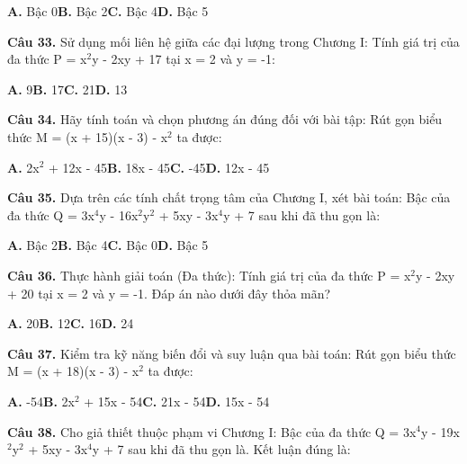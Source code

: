 \documentclass[11pt,a4paper]{article}
\begin{document}
\hspace*{1.5em}\textbf{A.} Bậc 0\quad\quad \textbf{B.} Bậc 2\quad\quad \textbf{C.} Bậc 4\quad\quad \textbf{D.} Bậc 5\par\vspace{2pt}
\textbf{\color{primary} Câu 33.} Sử dụng mối liên hệ giữa các đại lượng trong Chương I: Tính giá trị của đa thức P = x$^2$y - 2xy + 17 tại x = 2 và y = -1:\par
\hspace*{1.5em}\textbf{A.} 9\quad\quad \textbf{B.} 17\quad\quad \textbf{C.} 21\quad\quad \textbf{D.} 13\par\vspace{2pt}
\textbf{\color{primary} Câu 34.} Hãy tính toán và chọn phương án đúng đối với bài tập: Rút gọn biểu thức M = (x + 15)(x - 3) - x$^2$ ta được:\par
\hspace*{1.5em}\textbf{A.} 2x$^2$ + 12x - 45\quad\quad \textbf{B.} 18x - 45\quad\quad \textbf{C.} -45\quad\quad \textbf{D.} 12x - 45\par\vspace{2pt}
\textbf{\color{primary} Câu 35.} Dựa trên các tính chất trọng tâm của Chương I, xét bài toán: Bậc của đa thức Q = 3x$^4$y - 16x$^2$y$^2$ + 5xy - 3x$^4$y + 7 sau khi đã thu gọn là:\par
\hspace*{1.5em}\textbf{A.} Bậc 2\quad\quad \textbf{B.} Bậc 4\quad\quad \textbf{C.} Bậc 0\quad\quad \textbf{D.} Bậc 5\par\vspace{2pt}
\textbf{\color{primary} Câu 36.} Thực hành giải toán (Đa thức): Tính giá trị của đa thức P = x$^2$y - 2xy + 20 tại x = 2 và y = -1. Đáp án nào dưới đây thỏa mãn?\par
\hspace*{1.5em}\textbf{A.} 20\quad\quad \textbf{B.} 12\quad\quad \textbf{C.} 16\quad\quad \textbf{D.} 24\par\vspace{2pt}
\textbf{\color{primary} Câu 37.} Kiểm tra kỹ năng biến đổi và suy luận qua bài toán: Rút gọn biểu thức M = (x + 18)(x - 3) - x$^2$ ta được:\par
\hspace*{1.5em}\textbf{A.} -54\quad\quad \textbf{B.} 2x$^2$ + 15x - 54\quad\quad \textbf{C.} 21x - 54\quad\quad \textbf{D.} 15x - 54\par\vspace{2pt}
\textbf{\color{primary} Câu 38.} Cho giả thiết thuộc phạm vi Chương I: Bậc của đa thức Q = 3x$^4$y - 19x$^2$y$^2$ + 5xy - 3x$^4$y + 7 sau khi đã thu gọn là. Kết luận đúng là:\par
\end{document}

